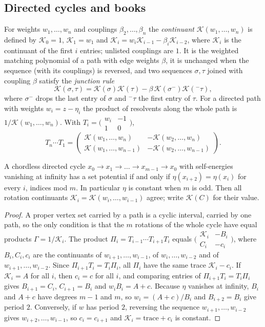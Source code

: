 \documentclass[final]{siamart0516}
\numberwithin{theorem}{section}
\numberwithin{equation}{section}
\theoremstyle{siamnonum}
\theoremstyle{plain}
\newcommand{\cont}{\mathcal{K}}           %
\begin{document}
\subsection{Directed cycles and books}\label{ssec:setpot-cycles}
For weights $w_1,\dots,w_n$ and couplings $\beta_2,\dots,\beta_n$ the \emph{continuant} $\cont(w_1,\dots,w_n)$ is defined by $\cont_0=1$, $\cont_1=w_1$ and $\cont_i=w_i\cont_{i-1}-\beta_i\cont_{i-2}$, where $\cont_i$ is the continuant of the first $i$ entries; unlisted couplings are $1$. It is the weighted matching polynomial of a path with edge weights $\beta$, it is unchanged when the sequence (with its couplings) is reversed, and two sequences $\sigma,\tau$ joined with coupling $\beta$ satisfy the \emph{junction rule}
\[
\cont(\sigma,\tau)=\cont(\sigma)\cont(\tau)-\beta\,\cont(\sigma^{-})\cont({}^{-}\tau),
\]
where $\sigma^{-}$ drops the last entry of $\sigma$ and ${}^{-}\tau$ the first entry of $\tau$. For a directed path with weights $w_i=z-\eta_i$ the product of resolvents along the whole path is $1/\cont(w_1,\dots,w_n)$. With $T_i=\bigl(\begin{smallmatrix}w_i&-1\\1&0\end{smallmatrix}\bigr)$,
\[
T_n\cdots T_1=\begin{pmatrix}\cont(w_1,\dots,w_n)&-\cont(w_2,\dots,w_n)\\ \cont(w_1,\dots,w_{n-1})&-\cont(w_2,\dots,w_{n-1})\end{pmatrix}.
\]

\begin{theorem}\label{thm:set-cycles}
A chordless directed cycle $x_0\to x_1\to\dots\to x_{m-1}\to x_0$ with self-energies vanishing at infinity has a set potential if and only if $\eta(x_{i+2})=\eta(x_i)$ for every $i$, indices mod $m$. In particular $\eta$ is constant when $m$ is odd. Then all rotation continuants $\cont_i=\cont(w_i,\dots,w_{i-1})$ agree; write $\cont(C)$ for their value.
\end{theorem}
\begin{proof}
A proper vertex set carried by a path is a cyclic interval, carried by one path, so the only condition is that the $m$ rotations of the whole cycle have equal products $\Gamma=1/\cont_i$. The product $\Pi_i=T_{i-1}\cdots T_{i+1}T_i$ equals $\bigl(\begin{smallmatrix}\cont_i&-B_i\\C_i&-c_i\end{smallmatrix}\bigr)$, where $B_i,C_i,c_i$ are the continuants of $w_{i+1},\dots,w_{i-1}$, of $w_i,\dots,w_{i-2}$ and of $w_{i+1},\dots,w_{i-2}$. Since $\Pi_{i+1}T_i=T_i\Pi_i$, all $\Pi_i$ have the same trace $\cont_i-c_i$. If $\cont_i=A$ for all $i$, then $c_i=c$ for all $i$, and comparing entries of $\Pi_{i+1}T_i=T_i\Pi_i$ gives $B_{i+1}=C_i$, $C_{i+1}=B_i$ and $w_iB_i=A+c$. Because $\eta$ vanishes at infinity, $B_i$ and $A+c$ have degrees $m-1$ and $m$, so $w_i=(A+c)/B_i$ and $B_{i+2}=B_i$ give period $2$. Conversely, if $w$ has period $2$, reversing the sequence $w_{i+1},\dots,w_{i-2}$ gives $w_{i+2},\dots,w_{i-1}$, so $c_i=c_{i+1}$ and $\cont_i=\text{trace}+c_i$ is constant.
\end{proof}
\end{document}
